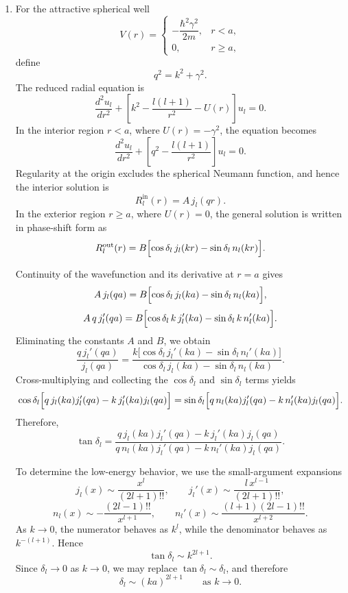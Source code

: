 \documentclass[12pt]{article}
\begin{document}
\begin{enumerate}[label=(\alph*)]
\begin{itemize}
For the \(s\)-wave \((l=0)\), we use
\[
j_0(x)=\frac{\sin x}{x},
\qquad
n_0(x)=-\frac{\cos x}{x},
\]
so that
\[
\tan\delta_0=\frac{j_0(ka)}{n_0(ka)}
=
-\tan(ka).
\]
Hence one may choose
\[
\boxed{
\delta_0=-ka
}
\]
modulo integer multiples of \(\pi\). This is the largest phase shift at low energy, since higher partial waves are suppressed by the centrifugal barrier \(\frac{l(l+1)}{r^2}\), while the \(s\)-wave experiences no such barrier.
\end{itemize}

\item For the attractive spherical well
\[
V(r)=
\begin{cases}
-\dfrac{\hbar^2\gamma^2}{2m}, & r<a,\\[6pt]
0, & r\ge a,
\end{cases}
\]
define
\[
q^2=k^2+\gamma^2.
\]
The reduced radial equation is
\[
\frac{d^2u_l}{dr^2}+\left[k^2-\frac{l(l+1)}{r^2}-U(r)\right]u_l=0.
\]
In the interior region \(r<a\), where \(U(r)=-\gamma^2\), the equation becomes
\[
\frac{d^2u_l}{dr^2}+\left[q^2-\frac{l(l+1)}{r^2}\right]u_l=0.
\]
Regularity at the origin excludes the spherical Neumann function, and hence the interior solution is
\[
R_l^{\text{in}}(r)=A\,j_l(qr).
\]
In the exterior region \(r\ge a\), where \(U(r)=0\), the general solution is written in phase-shift form as
\[
R_l^{\text{out}}(r)=B\Bigl[\cos\delta_l\,j_l(kr)-\sin\delta_l\,n_l(kr)\Bigr].
\]

Continuity of the wavefunction and its derivative at \(r=a\) gives
\[
A\,j_l(qa)=B\Bigl[\cos\delta_l\,j_l(ka)-\sin\delta_l\,n_l(ka)\Bigr],
\]
\[
A\,q\,j_l'(qa)=B\Bigl[\cos\delta_l\,k\,j_l'(ka)-\sin\delta_l\,k\,n_l'(ka)\Bigr].
\]
Eliminating the constants \(A\) and \(B\), we obtain
\[
\frac{q\,j_l'(qa)}{j_l(qa)}
=
\frac{k\bigl[\cos\delta_l\,j_l'(ka)-\sin\delta_l\,n_l'(ka)\bigr]}
{\cos\delta_l\,j_l(ka)-\sin\delta_l\,n_l(ka)}.
\]
Cross-multiplying and collecting the \(\cos\delta_l\) and \(\sin\delta_l\) terms yields
\[
\cos\delta_l\Bigl[q\,j_l(ka)j_l'(qa)-k\,j_l'(ka)j_l(qa)\Bigr]
=
\sin\delta_l\Bigl[q\,n_l(ka)j_l'(qa)-k\,n_l'(ka)j_l(qa)\Bigr].
\]
Therefore,
\[
\boxed{
\tan\delta_l=
\frac{q\,j_l(ka)j_l'(qa)-k\,j_l'(ka)j_l(qa)}
{q\,n_l(ka)j_l'(qa)-k\,n_l'(ka)j_l(qa)}
}.
\]

To determine the low-energy behavior, we use the small-argument expansions
\[
j_l(x)\sim \frac{x^l}{(2l+1)!!},
\qquad
j_l'(x)\sim \frac{l\,x^{l-1}}{(2l+1)!!},
\]
\[
n_l(x)\sim -\frac{(2l-1)!!}{x^{l+1}},
\qquad
n_l'(x)\sim \frac{(l+1)(2l-1)!!}{x^{l+2}}.
\]
As \(k\to 0\), the numerator behaves as \(k^l\), while the denominator behaves as \(k^{-(l+1)}\). Hence
\[
\tan\delta_l \sim k^{2l+1}.
\]
Since \(\delta_l\to 0\) as \(k\to 0\), we may replace \(\tan\delta_l\sim\delta_l\), and therefore
\[
\boxed{
\delta_l\sim (ka)^{2l+1}
\qquad \text{as } k\to 0.
}
\]


\end{enumerate}
\end{document}
